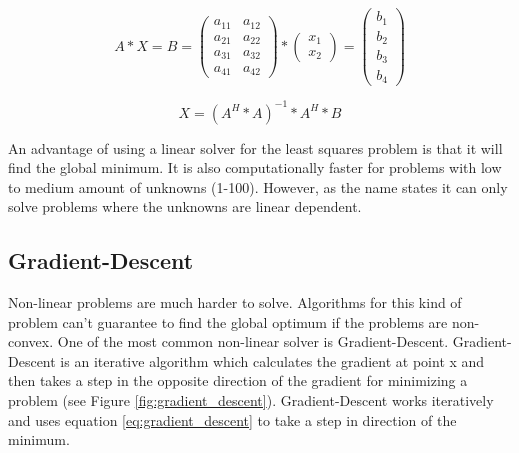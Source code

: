 \documentclass[11pt,a4paper,titlepage,oneside]{report}
\begin{document}
\begin{equation}\label{eq:least_squares_example2}
  A*X=B=\begin{pmatrix}
    a_{11} & a_{12} \\
    a_{21} & a_{22} \\
    a_{31} & a_{32} \\
    a_{41} & a_{42}
  \end{pmatrix}*
  \begin{pmatrix}
    x_1 \\
    x_2
  \end{pmatrix}=
  \begin{pmatrix}
    b_1 \\
    b_2 \\
    b_3 \\
    b_4
  \end{pmatrix}
\end{equation}

\begin{equation}\label{eq:least_squares_algorithm}
  X=(A^H*A)^{-1}*A^H*B 
\end{equation}

An advantage of using a linear solver for the least squares problem is that it will find the global minimum. It is also computationally faster for problems with low to medium amount of unknowns (1-100). However, as the name states it can only solve problems where the unknowns are linear dependent.

\subsection{Gradient-Descent}

Non-linear problems are much harder to solve. Algorithms for this kind of problem can't guarantee to find the global optimum if the problems are non-convex. One of the most common non-linear solver is Gradient-Descent. Gradient-Descent is an iterative algorithm which calculates the gradient at point x and then takes a step in the opposite direction of the gradient for minimizing a problem (see Figure \ref{fig:gradient_descent}). Gradient-Descent works iteratively and uses equation \ref{eq:gradient_descent} to take a step in direction of the minimum.
\end{document}
